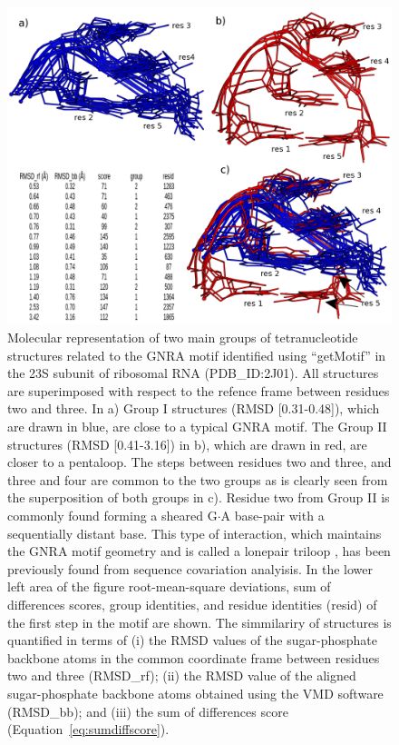 \begin{figure}
\centering 
\includegraphics[angle=0, scale=2.2]{Chapter5/groupsB.png}
\caption{Molecular    representation   of    two   main    groups   of
  tetranucleotide  structures  related to  the  GNRA motif  identified
  using   ``getMotif''   in  the   23S   subunit   of  ribosomal   RNA
  (PDB\_ID:2J01).  All structures are superimposed with respect to the
  refence  frame  between residues  two  and  three.   In a)  Group  I
  structures (RMSD [0.31-0.48]), which are drawn in blue, are close to
  a typical GNRA motif.  The Group II structures (RMSD [0.41-3.16]) in
  b), which  are drawn in red,  are closer to a  pentaloop.  The steps
  between residues two and three, and three and four are common to the
  two groups as is clearly  seen from the superposition of both groups
  in  c).  Residue  two  from Group  II  is commonly  found forming  a
  sheared G$\cdot$A base-pair with  a sequentially distant base.  This
  type of interaction, which maintains  the GNRA motif geometry and is
  called a lonepair triloop  \cite{lee2003}, has been previously found
  from sequence covariation  analyisis. In the lower left  area of the
  figure root-mean-square deviations, sum of differences scores, group
  identities, and residue identities (resid)  of the first step in the
  motif  are shown.  The  simmilariry of  structures is  quantified in
  terms of (i)  the RMSD values of the  sugar-phosphate backbone atoms
  in  the  common coordinate  frame  between  residues  two and  three
  (RMSD\_rf);  (ii)  the RMSD  value  of  the aligned  sugar-phosphate
  backbone  atoms obtained  using the  VMD  \cite{eargle2006} software
  (RMSD\_bb);    and   (iii)    the   sum    of    differences   score
  (Equation~\ref{eq:sumdiffscore}).}
\label{fig:groupsB}
\end{figure}

